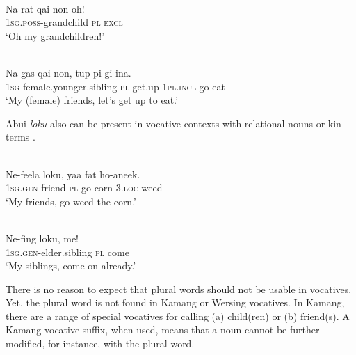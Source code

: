 \ea%
\label{ex:9:89}
 \\
\gll Na-{rat qai} non oh!  \\
  1\textsc{sg}.\textsc{poss}-grandchild \textsc{pl} \textsc{excl}   \\
\glt `Oh my grandchildren!'
\z







\ea%
\label{ex:9:90}
 \\
\gll  Na-{gas qai} non, tup pi gi ina. \\
   \textsc{1sg-}female.younger.sibling \textsc{pl} get.up \textsc{1pl.incl} go eat  \\
\glt `My (female) friends, let's get up to eat.'
\z






Abui \textit{loku} also can be present in vocative contexts with relational nouns  or kin terms .


\ea%
\label{ex:9:91}
 \\
\gll  Ne-feela loku, yaa fat ho-aneek.\\
   \textsc{1sg.gen-}friend \textsc{pl} go corn \textsc{3.loc}-weed \\
\glt `My friends, go weed the corn.'
\z







\ea%
\label{ex:9:92}
 \\
\gll  Ne-fing loku, me! \\
    \textsc{1sg.gen-}elder.sibling \textsc{pl} come \\
\glt `My siblings, come on already.'
\z






There is no reason to expect that plural words should not be usable in vocatives. Yet, the plural word is not found in Kamang or Wersing vocatives. In Kamang, there are a range of special vocatives for calling (a) child(ren) or (b) friend(s). A Kamang vocative suffix, when used, means that a noun cannot be further modified, for instance, with the plural word.

